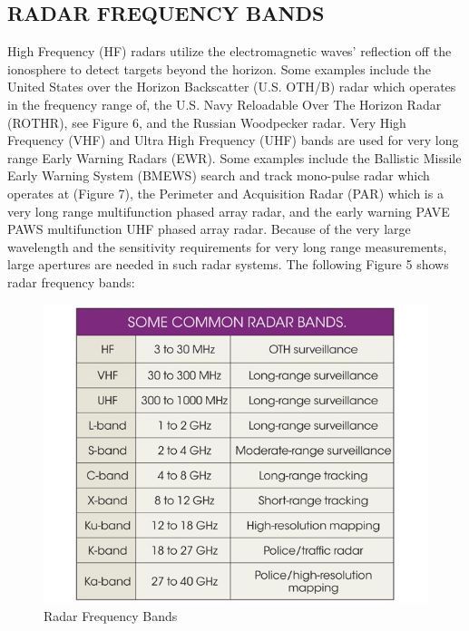 \documentclass[12pt]{article} %
\begin{document}
\subsection{RADAR FREQUENCY BANDS}
High Frequency (HF) radars utilize the electromagnetic waves’ reflection off the ionosphere to detect targets beyond the horizon. Some examples include the United States over the Horizon Backscatter (U.S. OTH/B) radar which operates in the frequency range of, the U.S. Navy Reloadable Over The Horizon Radar (ROTHR), see Figure 6, and the Russian Woodpecker radar. Very High Frequency (VHF) and Ultra High Frequency (UHF) bands are used for very long range Early Warning Radars (EWR). Some examples include the Ballistic Missile Early Warning System (BMEWS) search and track mono-pulse radar which operates at (Figure 7), the Perimeter and Acquisition Radar (PAR) which is a very long range multifunction phased
array radar, and the early warning PAVE PAWS multifunction UHF phased array radar. Because of the very large wavelength and the sensitivity requirements for very long range measurements, large apertures are needed in such radar systems.
\noindent  The following Figure 5 shows radar frequency bands:
\begin{figure}[H]
\centering
\includegraphics[width=0.8\linewidth]{band.jpg}
  \caption{Radar Frequency Bands}
  \label{fig:figure 5}
\end{figure}
\end{document}
